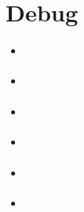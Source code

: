 \section{Debug}

\begin{itemize}

 \item \autocite{enwiki:1151790558}
 \item \autocite{enwiki:13438122}
 \item \autocite{cybeprotest}
 \item \autocite{web}
 \item \autocite{sep-set-theory}
 \item \autocite{link:CiteDrive2022}

\end{itemize}

\printbibliography


